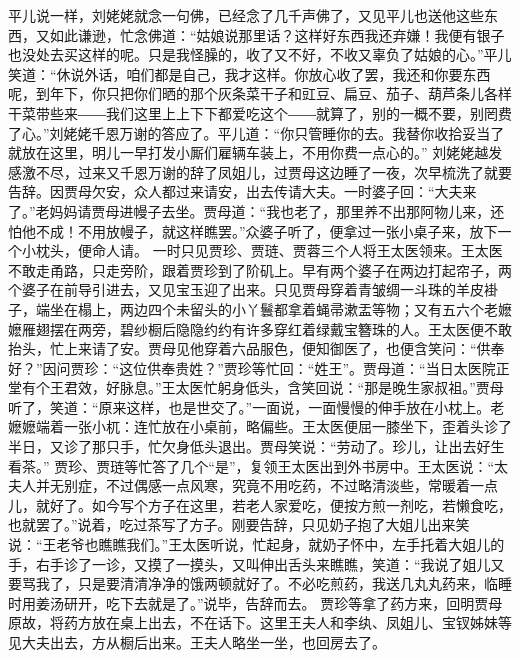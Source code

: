 \documentclass[12pt,oneside]{book}
\begin{document}
平儿说一样，刘姥姥就念一句佛，已经念了几千声佛了，又见平儿也送他这些东西，又如此谦逊，忙念佛道：“姑娘说那里话？这样好东西我还弃嫌！我便有银子也没处去买这样的呢。只是我怪臊的，收了又不好，不收又辜负了姑娘的心。”平儿笑道：“休说外话，咱们都是自己，我才这样。你放心收了罢，我还和你要东西呢，到年下，你只把你们晒的那个灰条菜干子和豇豆、扁豆、茄子、葫芦条儿各样干菜带些来――我们这里上上下下都爱吃这个――就算了，别的一概不要，别罔费了心。”刘姥姥千恩万谢的答应了。平儿道：“你只管睡你的去。我替你收拾妥当了就放在这里，明儿一早打发小厮们雇辆车装上，不用你费一点心的。”
刘姥姥越发感激不尽，过来又千恩万谢的辞了凤姐儿，过贾母这边睡了一夜，次早梳洗了就要告辞。因贾母欠安，众人都过来请安，出去传请大夫。一时婆子回：“大夫来了。”老妈妈请贾母进幔子去坐。贾母道：“我也老了，那里养不出那阿物儿来，还怕他不成！不用放幔子，就这样瞧罢。”众婆子听了，便拿过一张小桌子来，放下一个小枕头，便命人请。
一时只见贾珍、贾琏、贾蓉三个人将王太医领来。王太医不敢走甬路，只走旁阶，跟着贾珍到了阶矶上。早有两个婆子在两边打起帘子，两个婆子在前导引进去，又见宝玉迎了出来。只见贾母穿着青皱绸一斗珠的羊皮褂子，端坐在榻上，两边四个未留头的小丫鬟都拿着蝇帚漱盂等物；又有五六个老嬷嬷雁翅摆在两旁，碧纱橱后隐隐约约有许多穿红着绿戴宝簪珠的人。王太医便不敢抬头，忙上来请了安。贾母见他穿着六品服色，便知御医了，也便含笑问：“供奉好？”因问贾珍：“这位供奉贵姓？”贾珍等忙回：“姓王”。贾母道：“当日太医院正堂有个王君效，好脉息。”王太医忙躬身低头，含笑回说：“那是晚生家叔祖。”贾母听了，笑道：“原来这样，也是世交了。”一面说，一面慢慢的伸手放在小枕上。老嬷嬷端着一张小杌：连忙放在小桌前，略偏些。王太医便屈一膝坐下，歪着头诊了半日，又诊了那只手，忙欠身低头退出。贾母笑说：“劳动了。珍儿，让出去好生看茶。”
贾珍、贾琏等忙答了几个“是”，复领王太医出到外书房中。王太医说：“太夫人并无别症，不过偶感一点风寒，究竟不用吃药，不过略清淡些，常暖着一点儿，就好了。如今写个方子在这里，若老人家爱吃，便按方煎一剂吃，若懒食吃，也就罢了。”说着，吃过茶写了方子。刚要告辞，只见奶子抱了大姐儿出来笑说：“王老爷也瞧瞧我们。”王太医听说，忙起身，就奶子怀中，左手托着大姐儿的手，右手诊了一诊，又摸了一摸头，又叫伸出舌头来瞧瞧，笑道：“我说了姐儿又要骂我了，只是要清清净净的饿两顿就好了。不必吃煎药，我送几丸丸药来，临睡时用姜汤研开，吃下去就是了。”说毕，告辞而去。
贾珍等拿了药方来，回明贾母原故，将药方放在桌上出去，不在话下。这里王夫人和李纨、凤姐儿、宝钗姊妹等见大夫出去，方从橱后出来。王夫人略坐一坐，也回房去了。
\end{document}

